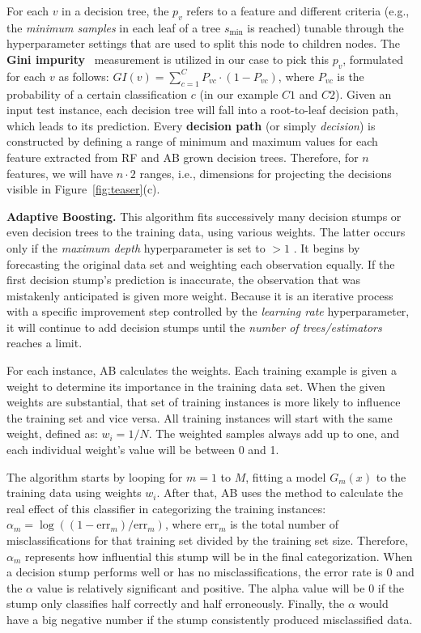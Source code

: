 For each $v$ in a decision tree, the $p_v$ refers to a feature and different criteria (e.g., the \emph{minimum samples} in each leaf of a tree $s_{\mathrm{min}}$ is reached) tunable through the hyperparameter settings that are used to split this node to children nodes. The \textbf{Gini impurity}~\cite{Genuer2010Variable} measurement is utilized in our case to pick this $p_v$, formulated for each $v$ as follows: $GI(v) = \sum_{c = 1}^C P_{vc} \cdot (1 - P_{vc})$, where $P_{vc}$ is the probability of a certain classification $c$ (in our example ${C}1$ and ${C}2$). Given an input test instance, each decision tree will fall into a root-to-leaf decision path, which leads to its prediction. Every \textbf{decision path} (or simply \emph{decision}) is constructed by defining a range of minimum and maximum values for each feature extracted from RF and AB grown decision trees. Therefore, for $n$ features, we will have $n \cdot 2$ ranges, i.e., dimensions for projecting the decisions visible in Figure~\ref{fig:teaser}(c).

\textbf{Adaptive Boosting.} This algorithm fits successively many decision stumps or even decision trees to the training data, using various weights. The latter occurs only if the \emph{maximum depth} hyperparameter is set to $>1$%
. It begins by forecasting the original data set and weighting each observation equally. If the first decision stump's prediction is inaccurate, the observation that was mistakenly anticipated is given more weight. Because it is an iterative process with a specific improvement step controlled by the \emph{learning rate} hyperparameter, it will continue to add decision stumps until the \emph{number of trees/estimators} reaches a limit.

For each instance, AB calculates the weights. Each training example is given a weight to determine its importance in the training data set. When the given weights are substantial, that set of training instances is more likely to influence the training set and vice versa. All training instances will start with the same weight, defined as: $w_i = 1/N$. The weighted samples always add up to one, and each individual weight's value will be between 0 and 1.

The algorithm starts by looping for $m = 1$ to $M$, fitting a model $G_m(x)$ to the training data using weights $w_i$. After that, AB uses the method to calculate the real effect of this classifier in categorizing the training instances: $\alpha_m = \log((1 - \text{err}_m) / \text{err}_m)$, where $\text{err}_m$ is the total number of misclassifications for that training set divided by the training set size. Therefore, $\alpha_m$ represents how influential this stump will be in the final categorization. When a decision stump performs well or has no misclassifications, the error rate is 0 and the $\alpha$ value is relatively significant and positive. The alpha value will be 0 if the stump only classifies half correctly and half erroneously. Finally, the $\alpha$ would have a big negative number if the stump consistently produced misclassified data.

